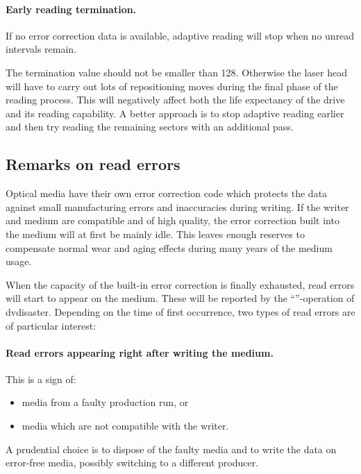 \paragraph{Early reading termination.} If no error correction
data is available, adaptive reading will stop when no unread intervals
 remain.

The termination value should not be smaller than 128. Otherwise the laser
head will have to carry out lots of repositioning moves during the final
phase of the reading process. This will negatively affect both the life
expectancy of the drive and its reading capability. A better approach is
to stop adaptive reading earlier and then try reading the remaining sectors
with an additional  pass. 

\subsection{Remarks on read errors}
\label{background-read-errors}

Optical media have their own error correction code which protects the data against
small manufacturing errors and inaccuracies during writing. If the writer and medium
are compatible and of high quality, the error correction built into the medium will
at first be mainly idle. This leaves enough reserves to compensate normal wear and
aging effects during many years of the medium usage.

\smallskip

When the capacity of the built-in error correction is finally exhausted, read errors
will start to appear on the medium. These will be reported by
the ``''-operation
of dvdisaster. Depending on the time of first occurrence, two types of read errors
are of particular interest:

\paragraph{Read errors appearing right after writing the medium.} This is a sign of:

\begin{itemize}
\item media from a faulty production run, or
\item media which are not compatible with the writer.
\end{itemize}

A prudential choice is to dispose of the faulty media and to write the data
on error-free media, possibly switching to a different producer.

